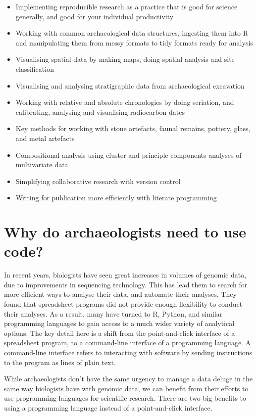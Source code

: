 \begin{itemize}
\item
  Implementing reproducible research as a practice that is good for
  science generally, and good for your individual productivity
\item
  Working with common archaeological data structures, ingesting them
  into R and manipulating them from messy formats to tidy formats ready
  for analysis
\item
  Visualising spatial data by making maps, doing spatial analysis and
  site classification
\item
  Visualising and analysing stratigraphic data from archaeological
  excavation
\item
  Working with relative and absolute chronologies by doing seriation,
  and calibrating, analysing and visualising radiocarbon dates
\item
  Key methods for working with stone artefacts, faunal remains, pottery,
  glass, and metal artefacts
\item
  Compositional analysis using cluster and principle components analyses
  of multivariate data
\item
  Simplifying collaborative research with version control
\item
  Writing for publication more efficiently with literate programming
\end{itemize}

\section{Why do archaeologists need to use code?}

In recent years, biologists have seen great increases in volumes of
genomic data, due to improvements in sequencing technology. This has
lead them to search for more efficient ways to analyse their data, and
automate their analyses. They found that spreadsheet programs did not
provide enough flexibility to conduct their analyses. As a result, many
have turned to R, Python, and similar programming languages to gain
access to a much wider variety of analytical options. The key detail
here is a shift from the point-and-click interface of a spreadsheet
program, to a command-line interface of a programming language. A
command-line interface refers to interacting with software by sending
instructions to the program as lines of plain text.

While archaeologists don't have the same urgency to manage a data deluge
in the same way biologists have with genomic data, we can benefit from
their efforts to use programming languages for scientific research.
There are two big benefits to using a programming language instead of a
point-and-click interface.

